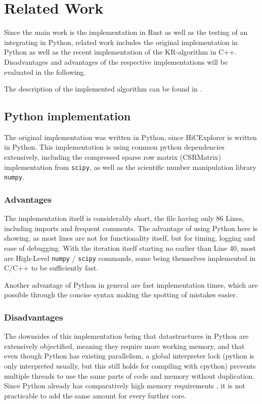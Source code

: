 \chapter{Related Work}\label{chap:relatedwork}

Since the main work is the implementation in Rust as well as the testing of an
integrating in Python, related work includes the original implementation in
Python as well as the recent implementation of the KR-algorithm in C++.
Disadvantages and advantages of the respective implementations will be
evaluated in the following.

The description of the implemented algorithm can be found in .


\section{Python implementation}\label{sec:python}

The original implementation was written in Python, since HiCExplorer is
written in Python. This implementation is using common python dependencies
extensively, including the compressed sparse row matrix (CSRMatrix)
implementation from \verb|scipy|, as well as the scientific number manipulation
library \verb|numpy|.

\subsection{Advantages}

The implementation itself is considerably short, the file having only 86 Lines,
including imports and frequent comments. The advantage of using Python here is
showing, as most lines are not for functionality itself, but for timing,
logging and ease of debugging. With the iteration itself starting no earlier
than Line 40, most are High-Level \verb|numpy| / \verb|scipy| commands, some
being themselves implemented in C/C++ to be sufficiently fast.

Another advantage of Python in general are fast implementation times, which are
possible through the concise syntax making the spotting of mistakes easier.

\subsection{Disadvantages}

The downsides of this implementation being that datastructures in Python are
extensively objectified, meaning they require more working memory, and that
even though Python has existing parallelism, a global interpreter lock (python
is only interpreted usually, but this still holds for compiling with cpython)
prevents multiple threads to use the same parts of code and memory without
duplication. Since Python already has comparatively high memory requirements
, it is not practicable to add the same amount
for every further core.

